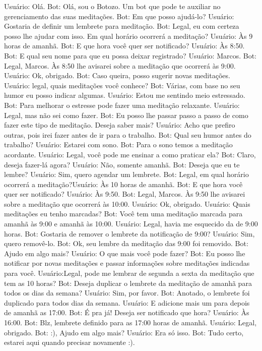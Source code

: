Usuário: Olá.
Bot: Olá, sou o Botozo. Um bot que pode te auxiliar no gerenciamento das suas meditações.
Bot: Em que posso ajudá-lo?
Usuário: Gostaria de definir um lembrete para meditação.
Bot: Legal, eu com certeza posso lhe ajudar com isso. Em qual horário ocorrerá a
meditação?
Usuário: Às 9 horas de amanhã.
Bot: E que hora você quer ser notificado?
Usuário: Às 8:50.
Bot: E qual seu nome para que eu possa deixar registrado?
Usuário: Marcos.
Bot: Legal, Marcos. Às 8:50 lhe avisarei sobre a meditação que ocorrerá às 9:00.
Usuário: Ok, obrigado.
Bot: Caso queira, posso sugerir novas meditações.
Usuário: legal, quais meditações você conhece?
Bot: Várias, com base no seu humor eu posso indicar algumas.
Usuário: Estou me sentindo meio estressado.
Bot: Para melhorar o estresse pode fazer uma meditação relaxante.
Usuário: Legal, mas não sei como fazer.
Bot: Eu posso lhe passar passo a passo de como fazer este tipo de meditação. Deseja
saber mais?
Usuário: Acho que prefiro outras, pois irei fazer antes de ir para o trabalho.
Bot: Qual seu humor antes do trabalho?
Usuário: Estarei com sono.
Bot: Para o sono temos a meditação acordante.
Usuário: Legal, você pode me ensinar a como praticar ela?
Bot: Claro, deseja fazer-lá agora?
Usuário: Não, somente amanhã.
Bot: Deseja que eu te lembre?
Usuário: Sim, quero agendar um lembrete.
Bot: Legal, em qual horário ocorrerá a meditação?Usuário: Às 10 horas de amanhã.
Bot: E que hora você quer ser notificado?
Usuário: Às 9:50.
Bot: Legal, Marcos. Às 9:50 lhe avisarei sobre a meditação que ocorrerá às 10:00.
Usuário: Ok, obrigado.
Usuário: Quais meditações eu tenho marcadas?
Bot: Você tem uma meditação marcada para amanhã às 9:00 e amanhã às 10:00.
Usuário: Legal, havia me esquecido da de 9:00 horas.
Bot: Gostaria de remover o lembrete da notificação de 9:00?
Usuário: Sim, quero removê-lo.
Bot: Ok, seu lembre da meditação das 9:00 foi removido.
Bot: Ajudo em algo mais?
Usuário: O que mais você pode fazer?
Bot: Eu posso lhe notificar por novas meditações e passar informações sobre meditações
indicadas para você.
Usuário:Legal, pode me lembrar de segunda a sexta da meditação que tem as 10 horas?
Bot: Deseja duplicar o lembrete da meditação de amanhã para todos os dias da semana?
Usuário: Sim, por favor.
Bot: Anotado, o lembrete foi duplicado para todos dias da semana.
Usuário: E adicione mais um para depois de amanhã as 17:00.
Bot: É pra já! Deseja ser notificado que hora?
Usuário: Às 16:00.
Bot: Blz, lembrete definido para as 17:00 horas de amanhã.
Usuário: Legal, obrigado.
Bot: :), Ajudo em algo mais?
Usuário: Era só isso.
Bot: Tudo certo, estarei aqui quando precisar novamente :).